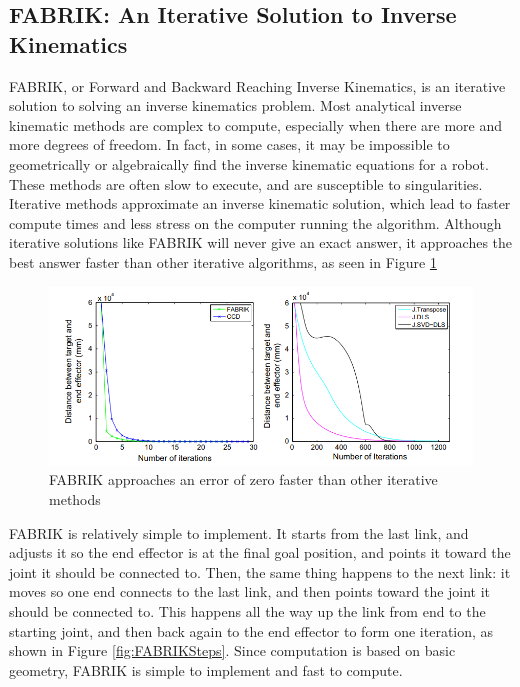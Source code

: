 \subsection{FABRIK: An Iterative Solution to Inverse Kinematics}
FABRIK, or Forward and Backward Reaching Inverse Kinematics, is an iterative solution to solving an inverse kinematics problem. Most analytical inverse kinematic methods are complex to compute, especially when there are more and more degrees of freedom. In fact, in some cases, it may be impossible to geometrically or algebraically find the inverse kinematic equations for a robot. These methods are often slow to execute, and are susceptible to singularities. Iterative methods approximate an inverse kinematic solution, which lead to faster compute times and less stress on the computer running the algorithm. Although iterative solutions like FABRIK will never give an exact answer, it approaches the best answer faster than other iterative algorithms, as seen in Figure \ref{fig:IterativeComparisons}
\begin{figure}[thbp]
    \centering
    \includegraphics[width=0.95\linewidth]{Figures/FABRIKComparisons}
    \caption{FABRIK approaches an error of zero faster than other iterative methods \cite{fabrik2011}}
    \label{fig:IterativeComparisons}
\end{figure}

FABRIK is relatively simple to implement. It starts from the last link, and adjusts it so the end effector is at the final goal position, and points it toward the joint it should be connected to. Then, the same thing happens to the next link: it moves so one end connects to the last link, and then points toward the joint it should be connected to. This happens all the way up the link from end to the starting joint, and then back again to the end effector to form one iteration, as shown in Figure \ref{fig:FABRIKSteps}. Since computation is based on basic geometry, FABRIK is simple to implement and fast to compute.

